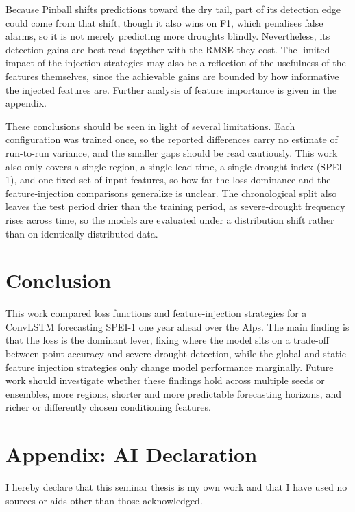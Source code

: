\documentclass[
]{krantz}
\begin{document}
Because Pinball shifts predictions toward the dry tail, part of its detection edge could come from that shift, though it also wins on F1, which penalises false alarms, so it is not merely predicting more droughts blindly.
Nevertheless, its detection gains are best read together with the RMSE they cost.
The limited impact of the injection strategies may also be a reflection of the usefulness of the features themselves, since the achievable gains are bounded by how informative the injected features are.
Further analysis of feature importance is given in the appendix.

These conclusions should be seen in light of several limitations.
Each configuration was trained once, so the reported differences carry no estimate of run-to-run variance, and the smaller gaps should be read cautiously.
This work also only covers a single region, a single lead time, a single drought index (SPEI-1), and one fixed set of input features, so how far the loss-dominance and the feature-injection comparisons generalize is unclear.
The chronological split also leaves the test period drier than the training period, as severe-drought frequency rises across time, so the models are evaluated under a distribution shift rather than on identically distributed data.

\section{Conclusion}\label{conclusion}

This work compared loss functions and feature-injection strategies for a ConvLSTM forecasting SPEI-1 one year ahead over the Alps.
The main finding is that the loss is the dominant lever, fixing where the model sits on a trade-off between point accuracy and severe-drought detection, while the global and static feature injection strategies only change model performance marginally.
Future work should investigate whether these findings hold across multiple seeds or ensembles, more regions, shorter and more predictable forecasting horizons, and richer or differently chosen conditioning features.

\section*{Appendix: AI Declaration}\label{appendix-ai-declaration}


I hereby declare that this seminar thesis is my own work and that I have used no sources or aids other than those acknowledged.
\end{document}
